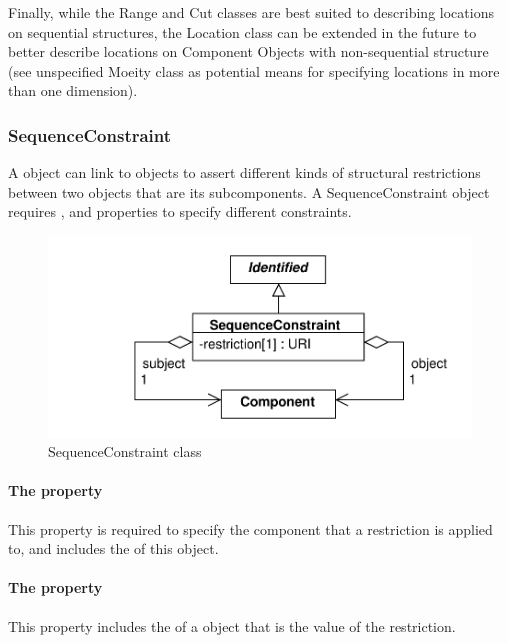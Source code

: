Finally, while the Range and Cut classes are best suited to describing locations on sequential structures, the Location class can be extended in the future to better describe locations on Component Objects with non-sequential structure (see unspecified Moeity class as potential means for specifying locations in more than one dimension).




\subsubsection{SequenceConstraint}
\label{sec:SequenceConstraint}
A  object can link to  objects to assert different kinds of structural restrictions between two  objects that are its subcomponents. A SequenceConstraint object requires ,  and  properties to specify different constraints.

\begin{figure}[ht]
\begin{center}
\includegraphics[scale=0.6]{uml/sequence_constraint}
\caption[]{SequenceConstraint class}
\label{uml:sequence_constraint}
\end{center}
\end{figure}

\paragraph{The  property}
\label{sec:subject}
This property is required to specify the component that a restriction is applied to, and includes the   of this  object. 

\paragraph{The  property}
\label{sec:object}
This property includes the   of a  object that is the value of the restriction.


